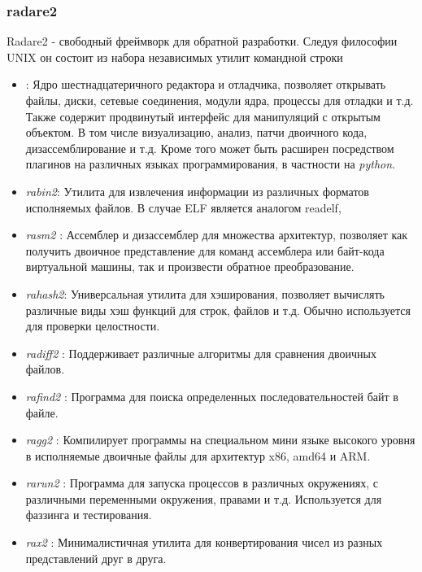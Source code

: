 \subsubsection{radare2}

Radare2 \cite{r2} - свободный фреймворк для обратной разработки. Следуя философии UNIX он состоит из набора независимых утилит командной строки

\begin{itemize}
\item {}: Ядро шестнадцатеричного редактора и отладчика, позволяет открывать файлы, диски, сетевые соединения, модули ядра, процессы для отладки и т.д. Также содержит продвинутый интерфейс для манипуляций с открытым объектом. В том числе визуализацию, анализ, патчи двоичного кода, дизассемблирование и т.д. Кроме того может быть расширен посредством плагинов на различных языках программирования, в частности на {\em python}.

\item {\em rabin2}: Утилита для извлечения информации из различных форматов исполняемых файлов.
В случае ELF является аналогом readelf,

\item {\em rasm2 }: Ассемблер и дизассемблер для множества архитектур, позволяет как получить двоичное представление для команд ассемблера или байт-кода виртуальной машины, так и произвести обратное преобразование.

\item {\em rahash2}: Универсальная утилита для хэширования, позволяет вычислять различные виды хэш функций для строк, файлов и т.д. Обычно используется для проверки целостности.

\item {\em radiff2 }: Поддерживает различные алгоритмы для сравнения двоичных файлов.

\item {\em rafind2 }: Программа для поиска определенных последовательностей байт в файле.

\item {\em ragg2 }: Компилирует программы на специальном мини языке высокого уровня в исполняемые двоичные файлы для архитектур x86, amd64 и ARM.

\item {\em rarun2 }: Программа для запуска процессов в различных окружениях, с различными переменными окружения, правами и т.д. Используется для фаззинга и тестирования.

\item {\em rax2 }: Минималистичная утилита для конвертирования чисел из разных представлений друг в друга.

\end{itemize}

